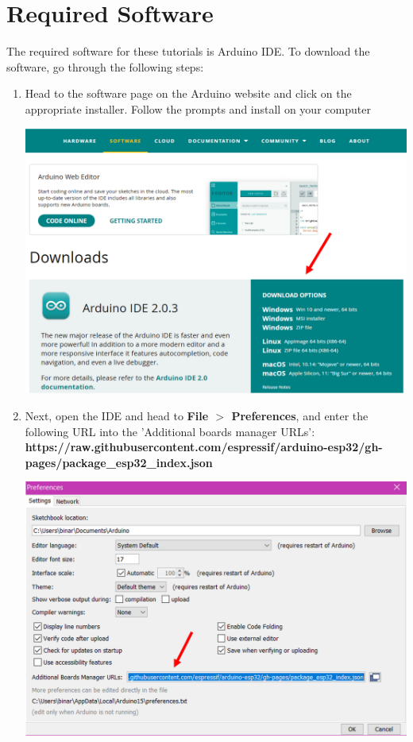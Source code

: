 \documentclass[a4paper,12pt]{report}
\newcommand{\imageWidth}{140mm}
\begin{document}
\section*{Required Software}
The required software for these tutorials is Arduino IDE. To download the software, go through the following steps:
    \begin{enumerate}
        \item Head to the software page on the Arduino website and click on the appropriate installer. Follow the prompts and install on your computer
        
        \begin{center}
            \includegraphics[width = \imageWidth]{Assets/Downloads_page.png}
        \end{center}
        
        \item Next, open the IDE and head to \textbf{File $>$ Preferences}, and enter the following URL into the 'Additional boards manager URLs':
        \textbf{https://raw.githubusercontent.com/espressif/arduino-esp32/gh-pages/package\_esp32\_index.json}
        
        \begin{center}
            \includegraphics[width = \imageWidth]{Assets/Esp_url.png}
        \end{center}
        

\end{enumerate}
\end{document}
